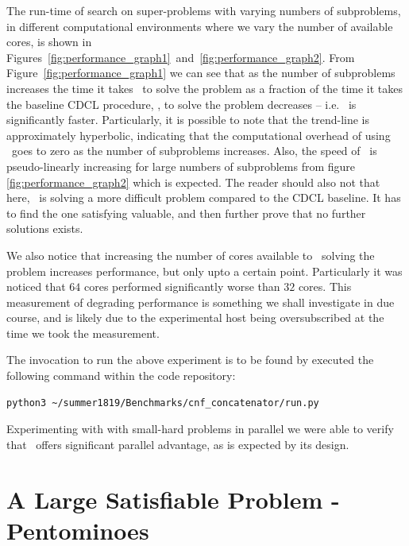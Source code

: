 \documentclass[
10pt, %
a4paper, %
oneside, %
headinclude,footinclude, %
BCOR5mm, %
]{scrartcl}
\begin{document}
The run-time of search on  super-problems with varying numbers of subproblems, in different computational environments where we vary the number of available cores, is shown in Figures~\ref{fig:performance_graph1}~and~\ref{fig:performance_graph2}.
From Figure~\ref{fig:performance_graph1} we can see that as the number of subproblems increases the time it takes \dagster\ to solve the problem as a fraction of the time it takes the baseline CDCL procedure, \tinisat, to solve the problem decreases -- i.e. \dagster\ is significantly faster.
Particularly, it is possible to note that the trend-line is approximately hyperbolic, indicating that the computational overhead of using \dagster\ goes to zero as the number of subproblems increases.
Also, the speed of \dagster\ is pseudo-linearly increasing for large numbers of subproblems from figure \ref{fig:performance_graph2} which is expected.
The reader should also not that here, \dagster\ is solving a more difficult problem compared to the CDCL baseline.
It has to find the one satisfying valuable, and then further prove that no further solutions exists.

We also notice that increasing the number of cores available to \dagster\ solving the problem increases performance, but only upto a certain point.
Particularly it was noticed that $64$ cores performed significantly worse than $32$ cores.
This measurement of degrading performance is something we shall investigate in due course, and is likely due to the experimental host being oversubscribed at the time we took the measurement. 

The invocation to run the above experiment is to be found by executed the following command within the code repository:

\begin{verbatim}
python3 ~/summer1819/Benchmarks/cnf_concatenator/run.py
\end{verbatim}

Experimenting with with small-hard problems in parallel we were able to verify that \dagster\ offers significant parallel advantage, as is expected by its design.




\clearpage


\section{A Large Satisfiable Problem - Pentominoes}
\end{document}
